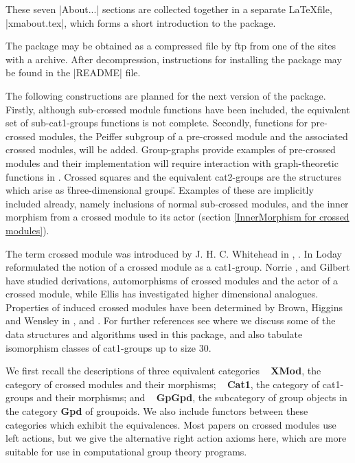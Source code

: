 \noindent
These seven |About...| sections are collected together in a separate 
\LaTeX file, |xmabout.tex|, which forms a short introduction to the package.

The package may be obtained as a compressed file by ftp from one of 
the sites with a {\GAP} archive.  After decompression,
instructions for installing the package may be found in the |README| file.

The following constructions are planned for the next version of the package.
Firstly, although sub-crossed module functions have been included,
the equivalent set of sub-cat1-groups functions is not complete.
Secondly, functions for pre-crossed modules, the Peiffer subgroup of a
pre-crossed module and the associated crossed modules, will be added.
Group-graphs provide examples of pre-crossed modules and their
implementation will require interaction with graph-theoretic
functions in {\GAP}.
Crossed squares and the equivalent cat2-groups are the structures
which arise as \"three-dimensional groups\".  
Examples of these are implicitly included already, namely inclusions of normal 
sub-crossed modules, and the inner morphism from a crossed module to its actor 
(section \ref{InnerMorphism for crossed modules}).



The term crossed module was introduced by J. H. C. Whitehead in 
\cite{W2}, \cite{W1}.
In \cite{L1} Loday reformulated the notion of a 
crossed module as a cat1-group.
Norrie \cite{N1}, \cite{N2} and Gilbert \cite{G1} have studied
derivations, automorphisms of crossed modules and the actor 
of a crossed module, while
Ellis \cite{E1} has investigated higher dimensional analogues.
Properties of induced crossed modules have been determined by 
Brown, Higgins and Wensley in \cite{BH1}, \cite{BW1} and \cite{BW2}.
For further references see \cite{AW1} where we discuss some of the
data structures and algorithms used in this package, and also tabulate
isomorphism classes of cat1-groups up to size $30$.

We first recall the descriptions of three equivalent categories\: ~
\textbf{XMod}, the category of crossed modules and their morphisms; ~
\textbf{Cat1}, the category of cat1-groups and their morphisms; and ~
\textbf{GpGpd}, the subcategory of group objects in the category
\textbf{Gpd} of groupoids.
We also include functors between these categories which exhibit
the equivalences.
Most papers on crossed modules use left actions, but we give the
alternative right action axioms here, which are more suitable for
use in computational group theory programs.


